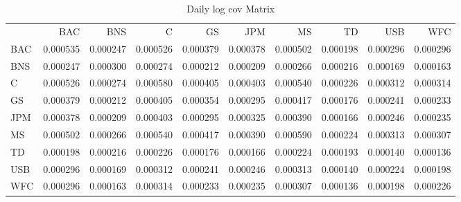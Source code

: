 \documentclass{article}
\begin{document}
\begin{table}
\caption{Daily log cov Matrix}
\label{tab:daily_log_cov}
\begin{tabular}{lrrrrrrrrr}
 & BAC & BNS & C & GS & JPM & MS & TD & USB & WFC \\
BAC & 0.000535 & 0.000247 & 0.000526 & 0.000379 & 0.000378 & 0.000502 & 0.000198 & 0.000296 & 0.000296 \\
BNS & 0.000247 & 0.000300 & 0.000274 & 0.000212 & 0.000209 & 0.000266 & 0.000216 & 0.000169 & 0.000163 \\
C & 0.000526 & 0.000274 & 0.000580 & 0.000405 & 0.000403 & 0.000540 & 0.000226 & 0.000312 & 0.000314 \\
GS & 0.000379 & 0.000212 & 0.000405 & 0.000354 & 0.000295 & 0.000417 & 0.000176 & 0.000241 & 0.000233 \\
JPM & 0.000378 & 0.000209 & 0.000403 & 0.000295 & 0.000325 & 0.000390 & 0.000166 & 0.000246 & 0.000235 \\
MS & 0.000502 & 0.000266 & 0.000540 & 0.000417 & 0.000390 & 0.000590 & 0.000224 & 0.000313 & 0.000307 \\
TD & 0.000198 & 0.000216 & 0.000226 & 0.000176 & 0.000166 & 0.000224 & 0.000193 & 0.000140 & 0.000136 \\
USB & 0.000296 & 0.000169 & 0.000312 & 0.000241 & 0.000246 & 0.000313 & 0.000140 & 0.000224 & 0.000198 \\
WFC & 0.000296 & 0.000163 & 0.000314 & 0.000233 & 0.000235 & 0.000307 & 0.000136 & 0.000198 & 0.000226 \\
\end{tabular}
\end{table}
\end{document}

